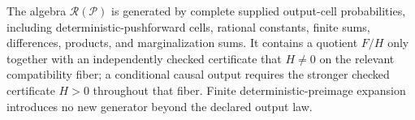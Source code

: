 The algebra \(\mathscr R(\mathcal P)\) is generated by complete supplied output-cell probabilities, including deterministic-pushforward cells, rational constants, finite sums, differences, products, and marginalization sums.  It contains a quotient \(F/H\) only together with an independently checked certificate that \(H\ne0\) on the relevant compatibility fiber; a conditional causal output requires the stronger checked certificate \(H>0\) throughout that fiber.  Finite deterministic-preimage expansion introduces no new generator beyond the declared output law.